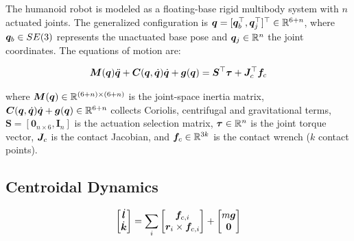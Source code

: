 
The humanoid robot is modeled as a floating-base rigid multibody system with
$n$ actuated joints. The generalized configuration is $\bm{q} = [\bm{q}_b^{\top},
\bm{q}_j^{\top}]^{\top} \in \mathbb{R}^{6+n}$, where $\bm{q}_b \in SE(3)$ represents
the unactuated base pose and $\bm{q}_j \in \mathbb{R}^{n}$ the joint coordinates.
The equations of motion are:

\begin{equation}
  \bm{M}(\bm{q}) \ddot{\bm{q}} + \bm{C}(\bm{q},\dot{\bm{q}})\dot{\bm{q}} + \bm{g}(\bm{q}) = \bm{S}^{\top} \bm{\tau} + \bm{J}_c^{\top} \bm{f}_c
  \label{eq:eom}
\end{equation}

\noindent where $\bm{M}(\bm{q}) \in \mathbb{R}^{(6+n)\times(6+n)}$ is the joint-space inertia matrix,
$\bm{C}(\bm{q},\dot{\bm{q}})\dot{\bm{q}} + \bm{g}(\bm{q}) \in \mathbb{R}^{6+n}$ collects Coriolis, centrifugal and gravitational terms,
$\bm{S} = [\bm{0}_{n\times 6}, \bm{I}_n]$ is the actuation selection matrix,
$\bm{\tau} \in \mathbb{R}^n$ is the joint torque vector, $\bm{J}_c$ is the contact
Jacobian, and $\bm{f}_c \in \mathbb{R}^{3k}$ is the contact wrench ($k$ contact points).

\lipsum[16]

\begin{criticalinsight}
\end{criticalinsight}

\subsection{Centroidal Dynamics}
\label{sec:centroidal}


\begin{equation}
  \begin{bmatrix} \dot{\bm{l}} \\ \dot{\bm{k}} \end{bmatrix}
  = \sum_{i} \begin{bmatrix} \bm{f}_{c,i} \\ \bm{r}_i \times \bm{f}_{c,i} \end{bmatrix}
  + \begin{bmatrix} m\bm{g} \\ \bm{0} \end{bmatrix}
  \label{eq:centroidal}
\end{equation}

